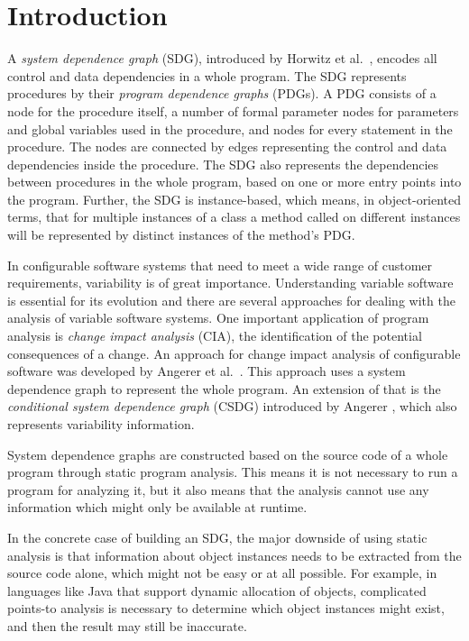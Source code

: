 \chapter{Introduction}

A \emph{system dependence graph} (SDG), introduced by Horwitz et al.\ \cite{DBLP:journals/toplas/HorwitzRB90}, encodes 
all control and data dependencies in a whole program. The SDG represents procedures by their \emph{program dependence 
graphs} (PDGs). A PDG consists of a node for the procedure itself, a number of formal parameter nodes for parameters 
and global variables used in the procedure, and nodes for every statement in the procedure. The nodes are connected by 
edges representing the control and data dependencies inside the procedure. The SDG also represents the dependencies 
between procedures in the whole program, based on one or more entry points into the program. Further, the SDG is 
instance-based, which means, in object-oriented terms, that for multiple instances of a class a method called on 
different instances will be represented by distinct instances of the method's PDG.

In configurable software systems that need to meet a wide range of customer requirements, variability is of great 
importance. Understanding variable software is essential for its evolution and there are several approaches for dealing 
with the analysis of variable software systems. One important application of program analysis is \emph{change impact 
analysis} (CIA), the identification of the potential consequences of a change. An approach for change impact analysis 
of configurable software was developed by Angerer et al.\ \cite{DBLP:conf/kbse/AngererGPG15}. This approach uses a 
system dependence graph to represent the whole program. An extension of that is the \emph{conditional system dependence 
graph} (CSDG) introduced by Angerer \cite{DBLP:conf/splc/AngererPLGG14}, which also represents variability information.

System dependence graphs are constructed based on the source code of a whole program through static program analysis. 
This means it is not necessary to run a program for analyzing it, but it also means that the analysis cannot use any 
information which might only be available at runtime.

In the concrete case of building an SDG, the major downside of using static analysis is that information about object 
instances needs to be extracted from the source code alone, which might not be easy or at all possible. For example, in 
languages like Java that support dynamic allocation of objects, complicated points-to analysis is necessary to 
determine which object instances might exist, and then the result may still be inaccurate.

